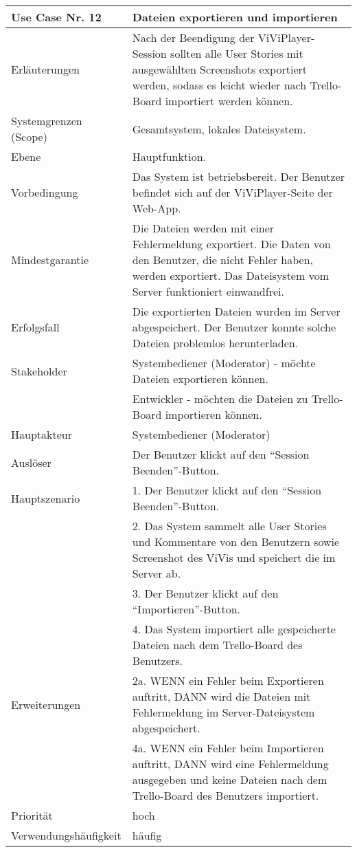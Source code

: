 \begin{tabularx}{\linewidth}{|l|X|}
	\hline
	Use Case Nr. 12			& \textbf{Dateien exportieren und importieren} \\ \hline
	Erläuterungen			& Nach der Beendigung der ViViPlayer-Session sollten alle User Stories mit 
							  ausgewählten Screenshots exportiert werden, sodass es leicht wieder nach Trello-Board importiert werden können. \\ \hline
	Systemgrenzen (Scope)	& Gesamtsystem, lokales Dateisystem. \\ \hline
	Ebene					& Hauptfunktion. \\ \hline
	Vorbedingung			& Das System ist betriebsbereit. Der Benutzer befindet sich auf der 
							  ViViPlayer-Seite der Web-App. \\ \hline
	Mindestgarantie			& Die Dateien werden mit einer Fehlermeldung exportiert. Die 
							  Daten von den Benutzer, die nicht Fehler haben, werden exportiert. Das Dateisystem vom Server funktioniert einwandfrei.\\ \hline
	Erfolgsfall				& Die exportierten Dateien wurden im Server abgespeichert. Der 
							  Benutzer konnte solche Dateien problemlos herunterladen. \\ \hline
	Stakeholder				& Systembediener (Moderator) - möchte Dateien exportieren können. \\ 
							& Entwickler - möchten die Dateien zu Trello-Board importieren können. \\ \hline
	Hauptakteur				& Systembediener (Moderator) \\ \hline
	Auslöser				& Der Benutzer klickt auf den ``Session Beenden''-Button. \\ \hline	
	Hauptszenario			& 1. Der Benutzer klickt auf den ``Session Beenden''-Button. \\
							& 2. Das System sammelt alle User Stories und Kommentare von den 
							  Benutzern sowie Screenshot des ViVis und speichert die im Server ab. \\
							& 3. Der Benutzer klickt auf den ``Importieren''-Button. \\
							& 4. Das System importiert alle gespeicherte Dateien nach dem Trello-Board des 
							  Benutzers. \\ \hline
	Erweiterungen			& 2a. WENN ein Fehler beim Exportieren auftritt, DANN wird die Dateien mit 
							  Fehlermeldung im Server-Dateisystem abgespeichert. \\ 
							& 4a. WENN ein Fehler beim Importieren auftritt, DANN wird eine Fehlermeldung 
							  ausgegeben und keine Dateien nach dem Trello-Board des Benutzers importiert. 
							  \\ \hline
	Priorität				& hoch \\ \hline
	Verwendungshäufigkeit	& häufig \\ \hline
\end{tabularx}

